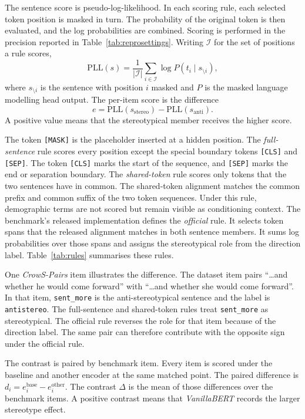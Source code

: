 \documentclass[sigconf,natbib=true,anonymous=true]{acmart}
\begin{document}
The sentence score is pseudo-log-likelihood. In each scoring rule, each selected
token position is masked in turn. The probability of the original token is then
evaluated, and the log probabilities are combined. Scoring is performed in the
precision reported in Table~\ref{tab:reprosettings}. Writing $\mathcal{I}$ for
the set of positions a rule scores,
%
\begin{equation}
\mathrm{PLL}(s) = \frac{1}{|\mathcal{I}|}
                  \sum_{i \in \mathcal{I}} \log P\!\left(t_i \mid s_{\setminus i}\right),
\end{equation}
%
where $s_{\setminus i}$ is the sentence with position $i$ masked and $P$ is the
masked language modelling head output. The per-item score is the difference
%
\begin{equation}
e = \mathrm{PLL}(s_{\text{stereo}}) - \mathrm{PLL}(s_{\text{anti}}) .
\end{equation}
%
A positive value means that the stereotypical member receives the higher score.

The token \texttt{[MASK]} is the placeholder inserted at a hidden position. The
\emph{full-sentence} rule scores every position except the special boundary
tokens \texttt{[CLS]} and \texttt{[SEP]}. The token \texttt{[CLS]} marks the
start of the sequence, and \texttt{[SEP]} marks the end or separation boundary.
The \emph{shared-token} rule scores only tokens that the two sentences have in
common. The shared-token alignment matches the common prefix and common suffix
of the two token sequences. Under this rule, demographic terms are not scored
but remain visible as conditioning context. The benchmark's released
implementation defines the \emph{official} rule. It selects token spans that the
released alignment matches in both sentence members. It sums log probabilities
over those spans and assigns the stereotypical role from the direction label.
Table~\ref{tab:rules} summarises these rules.

One \emph{CrowS-Pairs} item illustrates the difference. The dataset item pairs
``\ldots{}and whether he would come forward'' with ``\ldots{}and whether she
would come forward''. In that item, \texttt{sent\_more} is the
anti-stereotypical sentence and the label is \texttt{antistereo}. The
full-sentence and shared-token rules treat \texttt{sent\_more} as
stereotypical. The official rule reverses the role for that item because of the
direction label. The same pair can therefore contribute with the opposite sign
under the official rule.

The contrast is paired by benchmark item. Every item is scored under the
baseline and another encoder at the same matched point. The paired difference is
$d_i = e_i^{\text{base}} - e_i^{\text{other}}$. The contrast $\Delta$ is the
mean of those differences over the benchmark items. A positive contrast means
that \emph{VanillaBERT} records the larger stereotype effect.
\end{document}
